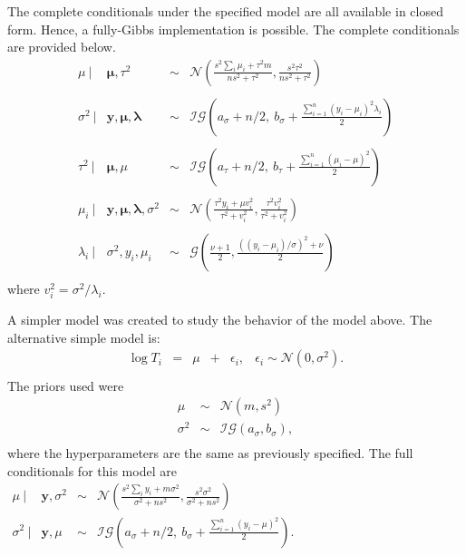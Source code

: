 \documentclass{../../tex_template/asaproc}
\newcommand{\N}{ \mathcal N }
\begin{document}
The complete conditionals under the specified model are all available in closed form.
Hence, a fully-Gibbs implementation is possible. The complete conditionals are provided
below.
$$
\begin{array}{rlcl}
  \mu ~|& \bm\mu,\tau^2 &\sim& \N(\frac{s^2\sum_i\mu_i + \tau^2m}{ns^2+\tau^2},\frac{s^2\tau^2}{ns^2+\tau^2}) \\
  \\
  \sigma^2 ~|& \bm y, \bm \mu, \bm \lambda &\sim& \mathcal{IG}(a_\sigma+n/2,~b_\sigma + \frac{\sum_{i=1}^n(y_i-\mu_i)^2\lambda_i}{2}) \\
  \\
  \tau^2 ~|& \bm\mu, \mu&\sim& \mathcal{IG}(a_\tau+n/2,~b_\tau + \frac{\sum_{i=1}^n(\mu_i-\mu)^2}{2}) \\
  \\
  \mu_i ~|& \bm{y,\mu,\lambda},\sigma^2 &\sim& \N(\frac{\tau^2 y_i + \mu v_i^2}{\tau^2+v_i^2},\frac{\tau^2 v_i^2}{\tau^2+v_i^2}) \\
  \\
  \lambda_i ~|& \sigma^2, y_i, \mu_i &\sim& \mathcal{G}(\frac{\nu+1}{2},\frac{((y_i-\mu_i)/\sigma)^2+\nu}{2})\\
\end{array}
$$
where $v_i^2 = \sigma^2/\lambda_i$.

A simpler model was created to study the behavior of the model above. The alternative simple model is:
$$
\begin{array}{rclclc}
  \log T_i &=& \mu &+&\epsilon_i, & \epsilon_i \sim \N(0,\sigma^2).\\
\end{array}
$$
The priors used were
$$
\begin{array}{rcl}
  \mu &\sim& \N(m,s^2) \\
  \sigma^2 &\sim& \mathcal{IG}(a_\sigma,b_\sigma), \\
\end{array}
$$
where the hyperparameters are the same as previously specified. The full conditionals
for this model are
$
\begin{array}{rlcl}
  \mu ~|& \bm{y},\sigma^2 &\sim& \N(\frac{s^2\sum_i y_i + m\sigma^2}{\sigma^2+ns^2},\frac{s^2\sigma^2}{\sigma^2+ns^2}) \\
  \sigma^2 ~|& \bm y, \mu &\sim& \mathcal{IG}(a_\sigma+n/2,~b_\sigma + \frac{\sum_{i=1}^n(y_i-\mu)^2}{2}). \\
\end{array}
$
\end{document}
